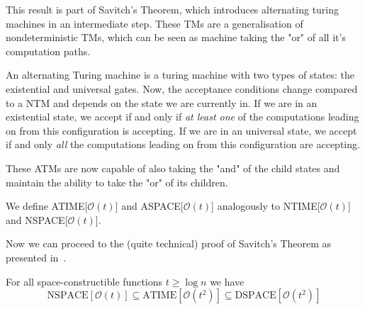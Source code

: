 This result is part of Savitch's Theorem, which introduces alternating turing machines in an intermediate step.
These TMs are a generalisation of nondeterministic TMs, which can be seen as machine taking the "or" of all it's computation paths.

\begin{define}
    An alternating Turing machine is a turing machine with two types of states: the existential and universal gates.
    Now, the acceptance conditions change compared to a NTM and depends on the state we are currently in.
    If we are in an existential state, we accept if and only if \emph{at least one} of the computations leading on from this configuration is accepting.
    If we are in an universal state, we accept if and only \emph{all} the computations leading on from this configuration are accepting.
\end{define}

These ATMs are now capable of also taking the "and" of the child states and maintain the ability to take the "or" of its children.

We define ATIME[$\mathcal{O}(t)$] and ASPACE[$\mathcal{O}(t)$] analogously to NTIME[$\mathcal{O}(t)$] and NSPACE[$\mathcal{O}(t)$].

Now we can proceed to the (quite technical) proof of Savitch's Theorem as presented in~\cite{descriptive-complexity}.

\begin{theorem}
    For all space-constructible functions $t \geq \log n$ we have
    \[
        \text{NSPACE}[\mathcal{O}(t)] \subseteq \text{ATIME}[\mathcal{O}(t^2)] \subseteq \text{DSPACE}[\mathcal{O}(t^2)]
    \]
\end{theorem}

